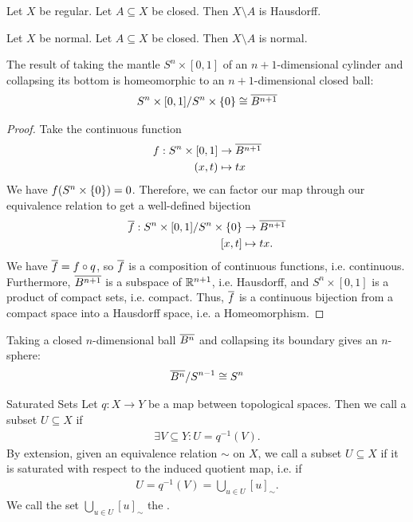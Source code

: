 \begin{theorem}
	Let $X$ be regular. Let $A \subseteq X$ be closed. Then $X \setminus A$ is Hausdorff.
\end{theorem}
\begin{theorem}
	Let $X$ be normal. Let $A \subseteq X$ be closed. Then $X \setminus A$ is normal.
\end{theorem}
\begin{theorem}
	The result of taking the mantle $S^n \times [0,1]$ of an $n+1$-dimensional cylinder and collapsing its bottom is homeomorphic to an $n+1$-dimensional closed ball:
	\begin{align*}
		S^n \times [0,1] / S^n \times \qty{0} \cong \overline{{B^{n+1}}}
	\end{align*}
\end{theorem}
\begin{proof}
	Take the continuous function
	\begin{align*}
		f : S^n \times [0,1] &\to \overline{{B^{n+1}}}\\
		(x,t) &\mapsto tx
	\end{align*}
	We have $f(S^n \times \qty{0}) = 0$. Therefore, we can factor our map through our equivalence relation to get a well-defined bijection
	\begin{align*}
		\overline{{f}} : S^n \times [0,1] / S^n \times \qty{0} &\to \overline{{B^{n+1}}}\\
		[x,t] &\mapsto tx.
	\end{align*}
	We have $\overline{{f}} = f \circ q$, so $\overline{{f}}$ is a composition of continuous functions, i.e. continuous.
	Furthermore, $\overline{{B^{n+1}}}$ is a subspace of $\mathbb{R}^{n+1}$, i.e. Hausdorff, and $S^n \times [0,1]$ is a product of compact sets, i.e. compact. Thus, $\overline{{f}}$ is a continuous bijection from a compact space into a Hausdorff space, i.e. a Homeomorphism.
\end{proof}
\begin{theorem}
	Taking a closed $n$-dimensional ball $\overline{{B^n}}$ and collapsing its boundary gives an $n$-sphere:
	\begin{align*}
		\overline{{B^n}} / S^{n-1} \cong S^n
	\end{align*}
\end{theorem}
\begin{importantdefinition}{Saturated Sets}{}
	Let $q : X \to Y$ be a map between topological spaces. Then we call a subset $U \subseteq X$  if
	\begin{align*}
		\exists V \subseteq Y : U = q^{-1}(V).
	\end{align*}
	By extension, given an equivalence relation $\sim$ on $X$, we call a subset $U \subseteq X$  if it is saturated with respect to the induced quotient map, i.e. if
	\begin{align*}
		U = q^{-1}(V) = \bigcup_{u \in U} [u]_\sim.
	\end{align*}
	We call the set $\bigcup_{u \in U} [u]_\sim$ the .
\end{importantdefinition}
